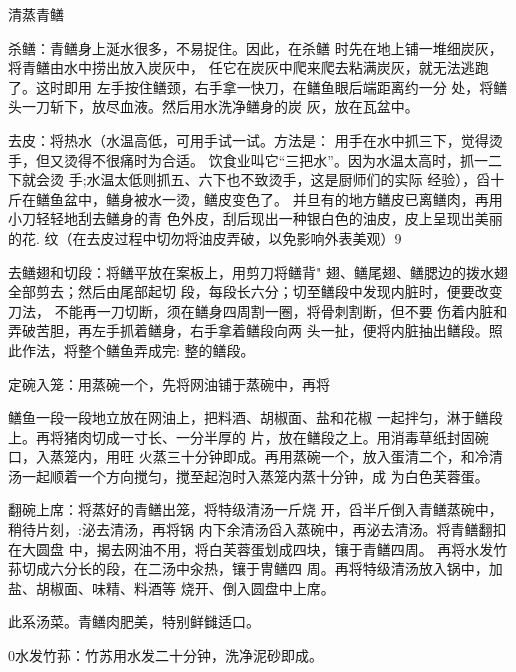 \begin{recipe}{清蒸青鳝}

\ingredients



\cooking

\step 杀鳝：青鳝身上涎水很多，不易捉住。因此，在杀鳝 时先在地上铺一堆细炭灰，将青鳝由水中捞出放入炭灰中， 任它在炭灰中爬来爬去粘满炭灰，就无法逃跑了。这时即用 左手按住鳝颈，右手拿一快刀，在鳝鱼眼后端距离约一分 处，将鳝头一刀斩下，放尽血液。然后用水洗净鳝身的炭 灰，放在瓦盆中。

\step 去皮：将热水（水温高低，可用手试一试。方法是： 用手在水中抓三下，觉得烫手，但又烫得不很痛时为合适。 饮食业叫它“三把水”。因为水温太高时，抓一二下就会烫 手;水温太低则抓五、六下也不致烫手，这是厨师们的实际 经验），舀十斤在鳝鱼盆中，鳝身被水一烫，鳝皮变色了。 并旦有的地方鳝皮已离鳝肉，再用小刀轻轻地刮去鳝身的青 色外皮，刮后现出一种银白色的油皮，皮上呈现岀美丽的花. 纹（在去皮过程中切勿将油皮弄破，以免影响外表美观）9

\step 去鳝翅和切段：将鳝平放在案板上，用剪刀将鳝背" 翅、鳝尾翅、鳝腮边的拨水翅全部剪去；然后由尾部起切 段，每段长六分；切至鳝段中发现内脏时，便要改变刀法， 不能再一刀切断，须在鳝身四周割一圈，将骨刺割断，但不要 伤着内脏和弄破苦胆，再左手抓着鳝身，右手拿着鳝段向两 头一扯，便将内脏抽出鳝段。照此作法，将整个鳝鱼弄成完: 整的鳝段。

\step 定碗入笼：用蒸碗一个，先将网油铺于蒸碗中，再将

鳝鱼一段一段地立放在网油上，把料酒、胡椒面、盐和花椒 一起拌匀，淋于鳝段上。再将猪肉切成一寸长、一分半厚的 片，放在鳝段之上。用消毒草纸封固碗口，入蒸笼内，用旺 火蒸三十分钟即成。再用蒸碗一个，放入蛋清二个，和冷清 汤一起顺着一个方向搅匀，搅至起泡时入蒸笼内蒸十分钟，成 为白色芙蓉蛋。

\step 翻碗上席：将蒸好的青鳝出笼，将特级清汤一斤烧 开，舀半斤倒入青鳝蒸碗中，稍待片刻，:泌去清汤，再将锅 内下余清汤舀入蒸碗中，再泌去清汤。将青鳝翻扣在大圆盘 中，揭去网油不用，将白芙蓉蛋划成四块，镶于青鳝四周。 再将水发竹荪切成六分长的段，在二汤中汆热，镶于冑鳝四 周。再将特级清汤放入锅中，加盐、胡椒面、味精、料酒等 烧开、倒入圆盘中上席。

\notes

此系汤菜。青鳝肉肥美，特别鲜雠适口。

0水发竹荪：竹苏用水发二十分钟，洗净泥砂即成。

\end{recipe}


